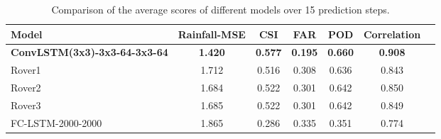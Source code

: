 \documentclass{article} \usepackage{amsmath}
\begin{document}
\begin{table}[!tb]
\caption{Comparison of the average scores of different models over 15 prediction steps.}
\centering
\begin{tabular}{|l|c|c|c|c|c|c|}

\hline
Model & Rainfall-MSE & CSI & FAR & POD & Correlation\\
\hline
\hline
\textbf{ConvLSTM(3x3)-3x3-64-3x3-64} & \textbf{1.420} & \textbf{0.577} & \textbf{0.195}& \textbf{0.660} & \textbf{0.908}\\
Rover1 & 1.712 & 0.516 & 0.308 & 0.636 & 0.843\\
Rover2 & 1.684 & 0.522 & 0.301 & 0.642 & 0.850\\
Rover3 & 1.685 & 0.522 & 0.301 & 0.642 & 0.849\\
FC-LSTM-2000-2000 & 1.865 & 0.286 & 0.335 & 0.351 & 0.774\\
\hline
\end{tabular}
\label{tbl:hko}
\vspace{-0.2em}
\end{table}
\end{document}
